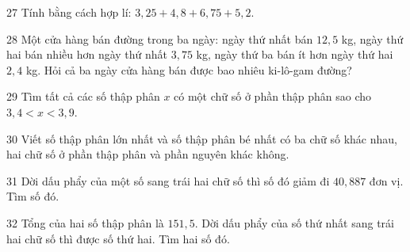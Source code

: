 \gap
\begin{probbox}{27}{\relax}
Tính bằng cách hợp lí: $3{,}25+4{,}8+6{,}75+5{,}2$.
\end{probbox}
\gap
\begin{probbox}{28}{\relax}
Một cửa hàng bán đường trong ba ngày: ngày thứ nhất bán $12{,}5$ kg, ngày thứ hai bán nhiều hơn ngày thứ nhất $3{,}75$ kg, ngày thứ ba bán ít hơn ngày thứ hai $2{,}4$ kg. Hỏi cả ba ngày cửa hàng bán được bao nhiêu ki-lô-gam đường?
\end{probbox}
\gap
\begin{probbox}{29}{\relax}
Tìm tất cả các số thập phân $x$ có một chữ số ở phần thập phân sao cho $3{,}4<x<3{,}9$.
\end{probbox}
\gap
\begin{probbox}{30}{\relax}
Viết số thập phân lớn nhất và số thập phân bé nhất có ba chữ số khác nhau, hai chữ số ở phần thập phân và phần nguyên khác không.
\end{probbox}
\begin{probbox}{31}{}
Dời dấu phẩy của một số sang trái hai chữ số thì số đó giảm đi $40{,}887$ đơn vị. Tìm số đó.
\end{probbox}
\gap
\begin{probbox}{32}{}
Tổng của hai số thập phân là $151{,}5$. Dời dấu phẩy của số thứ nhất sang trái hai chữ số thì được số thứ hai. Tìm hai số đó.
\end{probbox}
